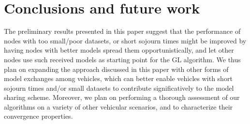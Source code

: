 \vspace{-0.15in}
\section{Conclusions and future work}
\label{sec:Conclusion}
The preliminary results presented in this paper suggest that the performance of nodes with too small/poor datasets, or short sojourn times might be improved by having nodes with better models spread them opportunistically, and let other nodes use such received models as starting point for the GL algorithm. We thus plan on expanding the approach discussed in this paper with other forms of model exchanges among vehicles, which can better enable vehicles with short sojourn times and/or small datasets to contribute significatively to the model sharing scheme. Moreover, we plan on performing a thorough assessment of our algorithms on a variety of other vehicular scenarios, and to characterize their convergence properties.


